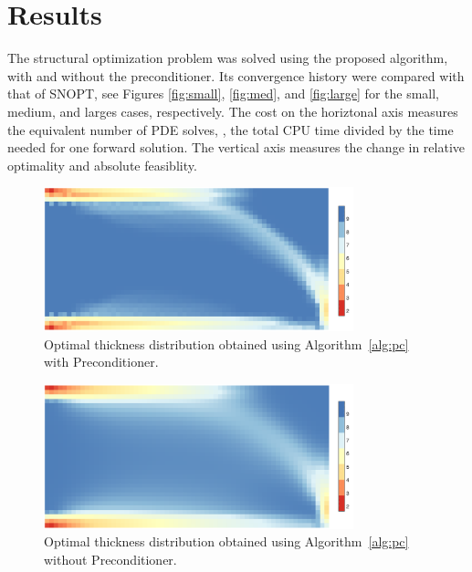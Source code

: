 \section{Results}
The structural optimization problem was solved using the proposed algorithm,
with and without the preconditioner. Its convergence history were compared with 
that of SNOPT, see Figures \ref{fig:small}, \ref{fig:med}, and \ref{fig:large} for the 
small, medium, and larges cases, respectively. The cost on the horiztonal axis 
measures the equivalent number of PDE solves, 
\ie, the total CPU time divided by the time needed for one
forward solution.  The vertical axis measures the change in relative optimality and
absolute feasiblity.    
  
\begin{figure}[tbp]
  \begin{center}
    \includegraphics*[width=0.8\textwidth]{./figs/chap6_fstopo/medium_thickness_color.pdf}%
    \caption{Optimal thickness distribution obtained using Algorithm~\ref{alg:pc} with Preconditioner.
      \label{fig:thick}}
  \end{center}
\end{figure}

\begin{figure}[tbp]
  \begin{center}
    \includegraphics*[width=0.8\textwidth]{./figs/chap6_fstopo/medium_eye_thickness_color.pdf}%
    \caption{Optimal thickness distribution obtained using Algorithm~\ref{alg:pc} without Preconditioner.
      \label{fig:thick_eye}}
  \end{center}
\end{figure}
    

